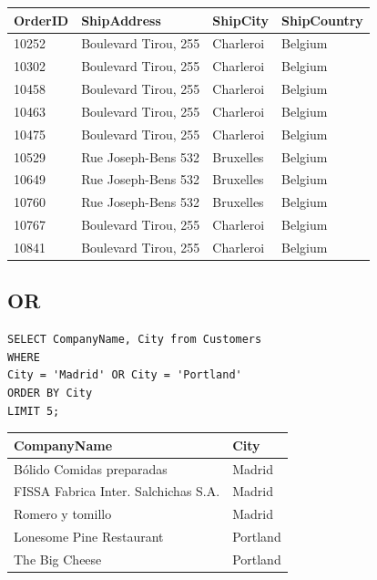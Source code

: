 \documentclass[10pt]{article}
\begin{document}
\begin{table}[H]
\begin{tabular}{|l|l|l|l|}
\hline
OrderID	& ShipAddress	& ShipCity	& ShipCountry \\
\hline
10252	& Boulevard Tirou, 255	& Charleroi	& Belgium \\
10302	& Boulevard Tirou, 255	& Charleroi	& Belgium \\
10458	& Boulevard Tirou, 255	& Charleroi	& Belgium \\
10463	& Boulevard Tirou, 255	& Charleroi	& Belgium \\
10475	& Boulevard Tirou, 255	& Charleroi	& Belgium \\
10529	& Rue Joseph-Bens 532	& Bruxelles	& Belgium \\
10649	& Rue Joseph-Bens 532	& Bruxelles	& Belgium \\
10760	& Rue Joseph-Bens 532	& Bruxelles	& Belgium \\
10767	& Boulevard Tirou, 255	& Charleroi	& Belgium \\
10841	& Boulevard Tirou, 255	& Charleroi	& Belgium \\
\hline
\end{tabular}
\end{table}



\subsection{OR}

\begin{verbatim}
SELECT CompanyName, City from Customers 
WHERE 
City = 'Madrid' OR City = 'Portland'
ORDER BY City 
LIMIT 5;
\end{verbatim}


\begin{table}[H]
\begin{tabular}{|l|l|}
\hline
CompanyName	& City \\
\hline
Bólido Comidas preparadas	& Madrid \\
FISSA Fabrica Inter. Salchichas S.A.	& Madrid \\
Romero y tomillo	& Madrid \\
Lonesome Pine Restaurant	& Portland \\
The Big Cheese	& Portland \\
\hline
\end{tabular}
\end{table}
\end{document}
